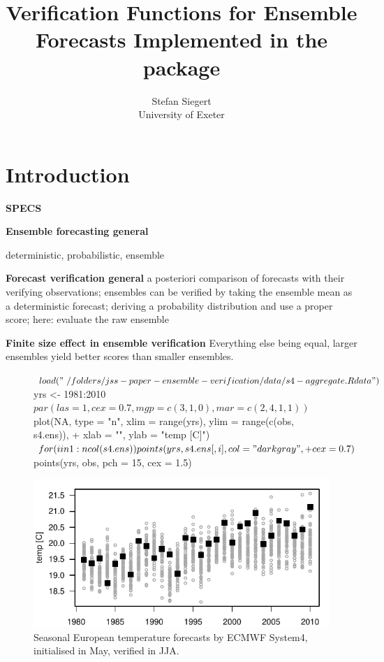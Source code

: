\documentclass[article]{jss}
\author{Stefan Siegert\\University of Exeter}
\title{Verification Functions for Ensemble Forecasts Implemented in the \proglang{R} package \pkg{SpecsVerification}}
\begin{document}



\section{Introduction}

{\bf SPECS}

{\bf Ensemble forecasting general}

deterministic, probabilistic, ensemble


{\bf Forecast verification general}
a posteriori comparison of forecasts with their verifying observations;
ensembles can be verified by taking the ensemble mean as a deterministic forecast; deriving a probability distribution and use a proper score; here: evaluate the raw ensemble

{\bf Finite size effect in ensemble verification}
Everything else being equal, larger ensembles yield better scores than smaller ensembles.




\begin{figure}
\begin{center}
%
\begin{Schunk}
\begin{Sinput}
$ load("~/folders/jss-paper-ensemble-verification/data/s4-aggregate.Rdata")
$ yrs <- 1981:2010
$ par(las = 1, cex = 0.7, mgp = c(3, 1, 0), mar = c(2, 4, 1, 1))
$ plot(NA, type = "n", xlim = range(yrs), ylim = range(c(obs, s4.ens)), 
+     xlab = "", ylab = "temp [C]")
$ for (i in 1:ncol(s4.ens)) points(yrs, s4.ens[, i], col = "darkgray", 
+     cex = 0.7)
$ points(yrs, obs, pch = 15, cex = 1.5)
\end{Sinput}
\end{Schunk}
\includegraphics{fig-s4-plot}
%
\end{center}
\caption{Seasonal European temperature forecasts by ECMWF System4, initialised in May, verified in JJA.}
\label{s4-plot2}
\end{figure}
\end{document}
